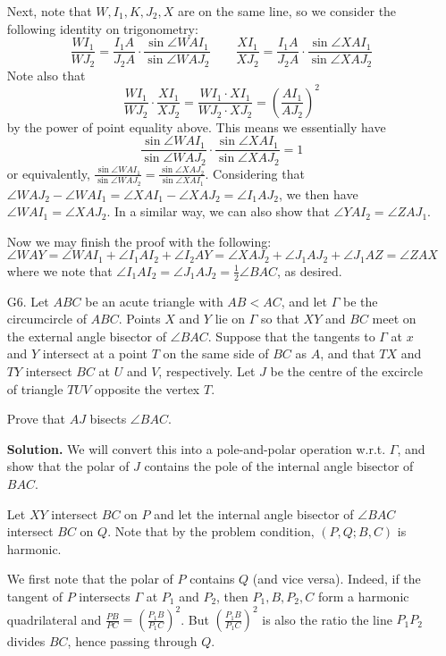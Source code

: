 \documentclass[11pt,a4paper]{article}
\begin{document}
\begin{enumerate}
    	Next, note that $W, I_1, K, J_2, X$ are on the same line, so we consider the following identity on trigonometry: 
    	\[
    	\frac{WI_1}{WJ_2} = \frac{I_1A}{J_2A}\cdot \frac{\sin\angle WAI_1}{\sin\angle WAJ_2}
    	\qquad 
    	\frac{XI_1}{XJ_2} = \frac{I_1A}{J_2A}\cdot \frac{\sin\angle XAI_1}{\sin\angle XAJ_2}
    	\]
    	Note also that 
    	\[
    	\frac{WI_1}{WJ_2}\cdot \frac{XI_1}{XJ_2}
    	=\frac{WI_1 \cdot XI_1}{WJ_2 \cdot XJ_2}
    	=(\frac{AI_1}{AJ_2})^2
    	\]
    	by the power of point equality above. 
    	This means we essentially have 
    	\[
    	\frac{\sin\angle WAI_1}{\sin\angle WAJ_2}\cdot 
    	\frac{\sin\angle XAI_1}{\sin\angle XAJ_2} = 1
    	\]
    	or equivalently, 
    	$\frac{\sin\angle WAI_1}{\sin\angle WAJ_2} = \frac{\sin\angle XAJ_2}{\sin\angle XAI_1}$. 
    	Considering that 
    	$\angle WAJ_2-\angle WAI_1 = \angle XAI_1 - \angle XAJ_2=\angle I_1AJ_2$, 
    	we then have 
    	$\angle WAI_1=\angle XAJ_2$. 
    	In a similar way, we can also show that 
    	$\angle YAI_2 = \angle ZAJ_1$. 
    	
    	Now we may finish the proof with the following: 
    	\[
    	\angle WAY
    	=\angle WAI_1+\angle I_1AI_2 + \angle I_2AY
    	=\angle XAJ_2+\angle J_1AJ_2 + \angle J_1AZ
    	=\angle ZAX
    	\]
    	where we note that $\angle I_1AI_2=\angle J_1AJ_2=\frac 12\angle BAC$, as desired. 
    	
    	\item [G6.] 
    	Let $ABC$ be an acute triangle with $AB < AC$, and let $\Gamma$ be the circumcircle of $ABC$. Points $X$ and $Y$ lie on $\Gamma$ so that $XY$ and $BC$ meet on the external angle bisector of $\angle BAC$. Suppose that the tangents to $\Gamma$ at $x$ and $Y$ intersect at a point $T$ on the same side of $BC$ as $A$, and that $TX$ and $TY$ intersect $BC$ at $U$ and $V$, respectively. Let $J$ be the centre of the excircle of triangle $TUV$ opposite the vertex $T$.
    	
    	Prove that $AJ$ bisects $\angle BAC$.
    	
    	\textbf{Solution.} We will convert this into a pole-and-polar operation w.r.t. $\Gamma$, 
    	and show that the polar of $J$ contains the pole of the internal angle bisector of $BAC$. 
    	
    	Let $XY$ intersect $BC$ on $P$ and let the internal angle bisector of $\angle BAC$ intersect $BC$ on $Q$. 
    	Note that by the problem condition, $(P, Q; B, C)$ is harmonic. 
    	
    	We first note that the polar of $P$ contains $Q$ (and vice versa). 
    	Indeed, if the tangent of $P$ intersects $\Gamma$ at $P_1$ and $P_2$, then $P_1, B, P_2, C$ form a harmonic quadrilateral and $\frac{PB}{PC} = (\frac{P_1B}{P_1C})^2$. 
    	But $(\frac{P_1B}{P_1C})^2$ is also the ratio the line $P_1P_2$ divides $BC$, hence passing through $Q$. 
    	

\end{enumerate}
\end{document}
